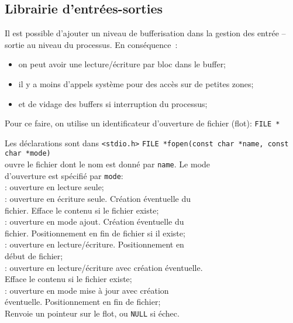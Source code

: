 \begin{frame}
    
  \section{Librairie d'entr\'ees-sorties}
  
  Il est possible d'ajouter un niveau de bufferisation dans la gestion
  des entr\'ee -- sortie au niveau du processus. En cons\'equence~:
\begin{itemize}
  \item on peut avoir une lecture/\'ecriture par bloc dans le buffer;
  \item il y a moins d'appels syst\`eme pour des acc\`es sur de petites zones;
  \item et de vidage des buffers si interruption du processus;
\end{itemize}
\par\medskip
Pour ce faire, on utilise un identificateur d'ouverture de fichier
(flot): {\tt FILE *}
\par\medskip
 Les d\'eclarations sont dans \verb?<stdio.h>?
 \newpage
{\tt FILE *fopen(const char *name, const char *mode)}\\
ouvre le fichier dont le nom est donn\'e par {\tt name}. Le mode \\
d'ouverture est sp\'ecifi\'e par {\tt mode}: \\
\hspace*{5mm}{\tt "r"}: ouverture en lecture seule;\\
\hspace*{5mm}{\tt "w"}: ouverture en \'ecriture seule. Cr\'eation
\'eventuelle du\\
\hspace*{7mm} fichier. Efface le contenu si le fichier existe;\\
\hspace*{5mm}{\tt "a"}: ouverture en mode ajout. Cr\'eation \'eventuelle
du \\
\hspace*{7mm} fichier. Positionnement en fin de fichier si il
existe;\\
\hspace*{5mm}{\tt "r+"}: ouverture en
lecture/\'ecriture. Positionnement en\\
\hspace*{7mm} d\'ebut de fichier;\\
\hspace*{5mm}{\tt "w+"}: ouverture en lecture/\'ecriture avec cr\'eation
\'eventuelle.\\
\hspace*{7mm}Efface le contenu si le fichier existe;\\
\hspace*{5mm}{\tt "a+"}: ouverture en mode mise \`a jour avec cr\'eation\\
\hspace*{7mm}\'eventuelle. Positionnement en fin de fichier;\\
Renvoie un pointeur sur le flot, ou {\tt NULL} si \'echec. \\



\end{frame}
